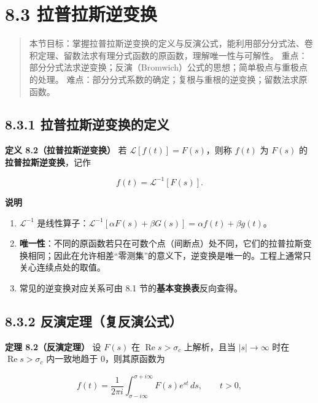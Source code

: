 \section{8.3
拉普拉斯逆变换}\label{ux62c9ux666eux62c9ux65afux9006ux53d8ux6362}

\begin{quote}
本节目标：掌握拉普拉斯逆变换的定义与反演公式，能利用部分分式法、卷积定理、留数法求有理分式函数的原函数，理解唯一性与可解性。
重点：部分分式法求逆变换；反演（Bromwich）公式的思想；简单极点与重极点的处理。
难点：部分分式系数的确定；复根与重根的逆变换；留数法求原函数。
\end{quote}

\subsection{8.3.1
拉普拉斯逆变换的定义}\label{ux62c9ux666eux62c9ux65afux9006ux53d8ux6362ux7684ux5b9aux4e49}

\textbf{定义 8.2（拉普拉斯逆变换）} 若 \(\mathcal{L}[f(t)]=F(s)\)，则称
\(f(t)\) 为 \(F(s)\) 的\textbf{拉普拉斯逆变换}，记作

\[
f(t)=\mathcal{L}^{-1}[F(s)].
\]

\textbf{说明}

\begin{enumerate}
\def\labelenumi{\arabic{enumi}.}
\tightlist
\item
  \(\mathcal{L}^{-1}\)
  是线性算子：\(\mathcal{L}^{-1}[\alpha F(s)+\beta G(s)]=\alpha f(t)+\beta g(t)\)。
\item
  \textbf{唯一性}：不同的原函数若只在可数个点（间断点）处不同，它们的拉普拉斯变换相同；因此在允许相差``零测集''的意义下，逆变换是唯一的。工程上通常只关心连续点处的取值。
\item
  常见的逆变换对应关系可由 8.1 节的\textbf{基本变换表}反向查得。
\end{enumerate}

\subsection{8.3.2
反演定理（复反演公式）}\label{ux53cdux6f14ux5b9aux7406ux590dux53cdux6f14ux516cux5f0f}

\textbf{定理 8.2（反演定理）} 设 \(F(s)\) 在
\(\operatorname{Re}s>\sigma_c\) 上解析，且当 \(|s|\to\infty\) 时在
\(\operatorname{Re}s>\sigma_c\) 内一致地趋于 \(0\)，则其原函数为

\[
f(t)=\frac{1}{2\pi i}\int_{\sigma-i\infty}^{\sigma+i\infty}F(s)e^{st}\,ds,\qquad t>0,
\]

